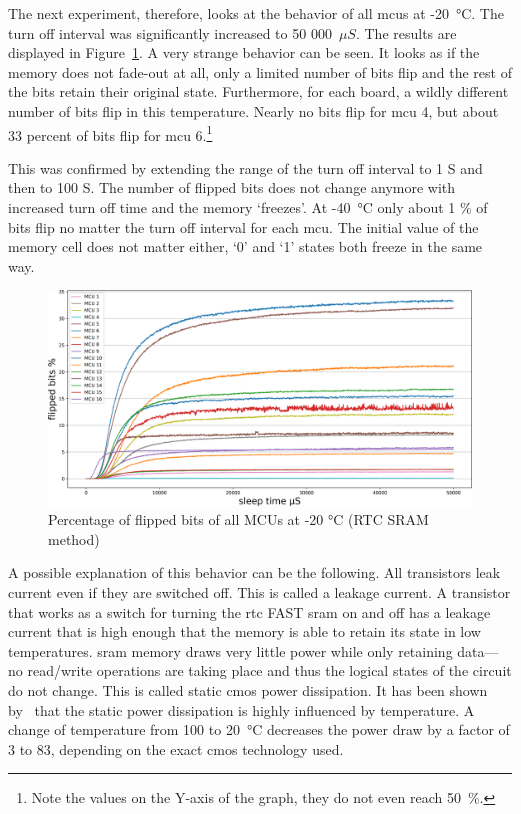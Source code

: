 The next experiment, therefore, looks at the behavior of all \glspl{mcu} at -20~°C. The turn off interval was significantly increased to 50 000~$\mu{}S$. The results are displayed in Figure~\ref{fig:all_minus_20_rtc}. A very strange behavior can be seen. It looks as if the memory does not fade-out at all, only a limited number of bits flip and the rest of the bits retain their original state. Furthermore, for each board, a wildly different number of bits flip in this temperature. Nearly no bits flip for \gls{mcu} 4, but about 33 percent of bits flip for \gls{mcu} 6.\footnote{Note the values on the Y-axis of the graph, they do not even reach 50~\%.}

This was confirmed by extending the range of the turn off interval to 1 S and then to 100 S. The number of flipped bits does not change anymore with increased turn off time and the memory `freezes'. At -40~°C only about 1 \% of bits flip no matter the turn off interval for each \gls{mcu}. The initial value of the memory cell does not matter either, `0' and `1' states both freeze in the same way. 

\begin{figure}[ht!]
    \centering
    \captionsetup{justification=centering,margin=0.5cm}
    \includegraphics[width=\textwidth]{images/all_minus_20_rtc.png}
    \caption{Percentage of flipped bits of all MCUs at -20 °C (RTC SRAM method)}
    \label{fig:all_minus_20_rtc}
\end{figure}

A possible explanation of this behavior can be the following. All transistors leak current even if they are switched off. This is called a leakage current. A transistor that works as a switch for turning the \gls{rtc} FAST \gls{sram} on and off has a leakage current that is high enough that the memory is able to retain its state in low temperatures. \gls{sram} memory draws very little power while only retaining data---no read/write operations are taking place and thus the logical states of the circuit do not change. This is called static \gls{cmos} power dissipation. It has been shown by~\cite{Kocanda2015} that the static power dissipation is highly influenced by temperature. A change of temperature from 100 to 20~°C decreases the power draw by a factor of 3 to 83, depending on the exact \gls{cmos} technology used.


